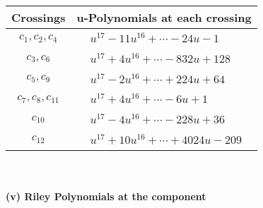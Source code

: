 \documentclass[1p]{elsarticle_modified}
\theoremstyle{definition}
\begin{document}
\begin{tabular}{m{50pt}|m{274pt}}
Crossings & \hspace{64pt}u-Polynomials at each crossing \\
\hline $$\begin{aligned}c_{1},c_{2},c_{4}\end{aligned}$$&$\begin{aligned}
&u^{17}-11 u^{16}+\cdots-24 u-1
\end{aligned}$\\
\hline $$\begin{aligned}c_{3},c_{6}\end{aligned}$$&$\begin{aligned}
&u^{17}+4 u^{16}+\cdots-832 u+128
\end{aligned}$\\
\hline $$\begin{aligned}c_{5},c_{9}\end{aligned}$$&$\begin{aligned}
&u^{17}-2 u^{16}+\cdots+224 u+64
\end{aligned}$\\
\hline $$\begin{aligned}c_{7},c_{8},c_{11}\end{aligned}$$&$\begin{aligned}
&u^{17}+4 u^{16}+\cdots-6 u+1
\end{aligned}$\\
\hline $$\begin{aligned}c_{10}\end{aligned}$$&$\begin{aligned}
&u^{17}-4 u^{16}+\cdots-228 u+36
\end{aligned}$\\
\hline $$\begin{aligned}c_{12}\end{aligned}$$&$\begin{aligned}
&u^{17}+10 u^{16}+\cdots+4024 u-209
\end{aligned}$\\
\hline
\end{tabular}\\~\\
\newpage\renewcommand{\arraystretch}{1}
\flushleft \textbf{(v) Riley Polynomials at the component}\newline \\
\end{document}
